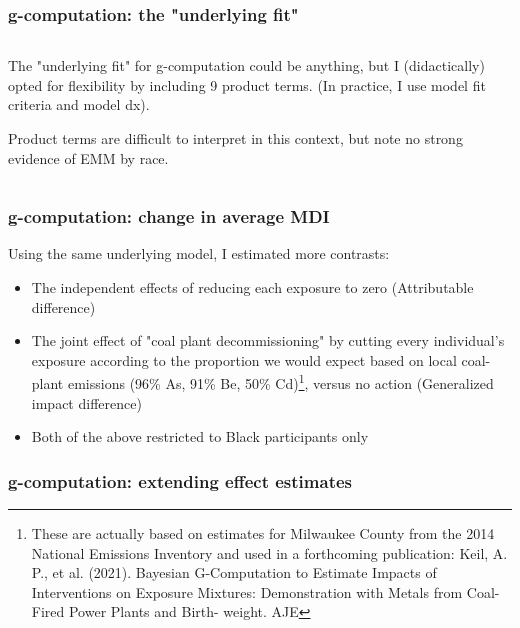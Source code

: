 \begin{frame}[t, fragile]
  \frametitle{g-computation: the "underlying fit"}
    \begin{columns}
    \begin{column}[c]{.4\textwidth}
    The "underlying fit" for g-computation could be anything, but I (didactically) opted for flexibility by including 9 product terms. (In practice, I use model fit criteria and model dx).
    \bigskip
    
    Product terms are difficult to interpret in this context, but note no strong evidence of EMM by race. 
    \end{column}
    \begin{column}[c]{.6\textwidth}
    {\scriptsize }
    \end{column}
  \end{columns}
\end{frame}

\begin{frame}[t, fragile]
  \frametitle{g-computation: change in average MDI}
Using the same underlying model, I estimated more contrasts:
    \begin{itemize}
      \item The independent effects of reducing each exposure to zero (Attributable difference)
      \item The joint effect of "coal plant decommissioning" by cutting every individual's exposure according to the proportion we would expect based on local coal-plant emissions (96\% As, 91\% Be, 50\% Cd)\footnote{These are actually based on estimates for Milwaukee County from the 2014 National Emissions Inventory and used in a forthcoming publication: Keil, A. P., et al. (2021). Bayesian G-Computation to Estimate Impacts of Interventions on Exposure Mixtures: Demonstration with Metals from Coal-Fired Power Plants and Birth- weight. AJE}, versus no action (Generalized impact difference)     
     \item Both of the above restricted to Black participants only 
    \end{itemize}
 \end{frame}

\begin{frame}[t, fragile]
  \frametitle{g-computation: extending effect estimates}
  
 \end{frame}


